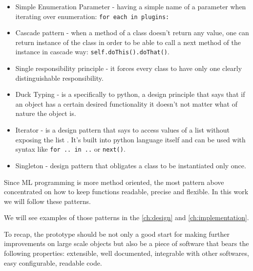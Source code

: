 \begin{itemize}
	\item Simple Enumeration Parameter - having a simple name of a parameter
		when iterating over enumeration: \lstinline{for each in plugins:} \cite{beck1997smalltalk}
	\item Cascade pattern - when a method of a class doesn't return any value,
		one can return instance of the class in order to be able to call a
		next method of the instance in cascade way: \lstinline{self.doThis().doThat()}.\cite{beck1997smalltalk}
	\item Single responsibility principle - it forces every class to have only one
		clearly distinguishable responsibility.\cite{martin2003agile}
	\item Duck Typing - is a specifically to python, a design principle that
		says that if an object has a certain desired functionality it doesn't not matter
		what of nature the object is.
	\item Iterator - is a design pattern that says to access values of a list
	 	without exposing the list \cite{Gamma:1995:DPE:186897}. It's built into python language itself and
		can be used with syntax like \lstinline{for .. in ..} or \lstinline{next()}.
	\item Singleton - design pattern that obligates a class to be
		instantiated only once. \cite{Eckel2017}
\end{itemize}

Since ML programming is more method oriented, the most pattern above concentrated
on how to keep functions readable, precise and flexible. In this work we will follow
these patterns.

We will see examples of those patterns in the \autoref{ch:design}
and \autoref{ch:implementation}.

To recap, the prototype should be not only a good start for making further
improvements on large scale objects but also be a piece of software that bears the
following properties: extensible, well documented, integrable with other
softwares, easy configurable, readable code.


